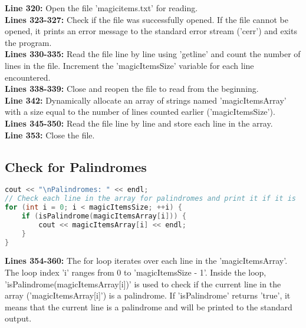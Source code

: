 \documentclass[letterpaper, 10pt,DIV=13]{scrartcl}
\numberwithin{equation}{section} %
\numberwithin{figure}{section} %
\numberwithin{table}{section} %
\begin{document}
\textbf{Line 320:} Open the file 'magicitems.txt' for reading. \\
\textbf{Lines 323-327:} Check if the file was successfully opened. If the file cannot be opened, it prints an error message to the standard error stream ('cerr') and exits the program. \\
\textbf{Lines 330-335:} Read the file line by line using 'getline' and count the number of lines in the file. Increment the 'magicItemsSize' variable for each line encountered. \\
\textbf{Lines 338-339:} Close and reopen the file to read from the beginning. \\
\textbf{Line 342:} Dynamically allocate an array of strings named 'magicItemsArray' with a size equal to the number of lines counted earlier ('magicItemsSize'). \\
\textbf{Lines 345-350:} Read the file line by line and store each line in the array. \\
\textbf{Line 353:} Close the file.

\subsection{Check for Palindromes}
\begin{linenumbers}
\begin{lstlisting}[language=C++, caption={Check for Palindromes}, label={code:example}]
cout << "\nPalindromes: " << endl;
// Check each line in the array for palindromes and print it if it is
for (int i = 0; i < magicItemsSize; ++i) {
    if (isPalindrome(magicItemsArray[i])) {
        cout << magicItemsArray[i] << endl;
    }
}
\end{lstlisting}
\end{linenumbers}
\nolinenumbers

\textbf{Lines 354-360:} The for loop iterates over each line in the 'magicItemsArray'. The loop index 'i' ranges from 0 to 'magicItemsSize - 1'. Inside the loop, 'isPalindrome(magicItemsArray[i])' is used to check if the current line in the array ('magicItemsArray[i]') is a palindrome. If 'isPalindrome' returns 'true', it means that the current line is a palindrome and will be printed to the standard output.
\end{document}
